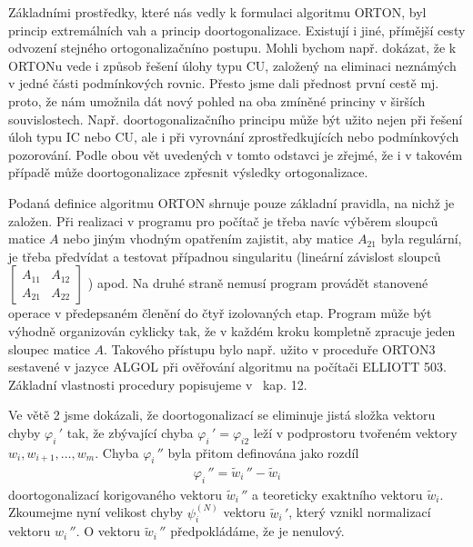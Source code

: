 Základními  prostředky, které nás vedly k formulaci
algoritmu ORTON, byl  princip extremálních vah a princip
doortogonalizace. Existují i jiné, přímější cesty odvození
stejného ortogonalizačníno postupu. Mohli bychom např. dokázat, že
k ORTONu vede i způsob řešení úlohy typu CU, založený na
eliminaci neznámých v jedné části podmínkových rovnic. Přesto jsme
dali přednost první cestě mj. proto, že nám umožnila dát nový
pohled na oba zmíněné princiny v širších souvislostech. Např.
doortogonalizačního principu může být užito nejen při řešení
úloh typu IC nebo CU, ale i při vyrovnání zprostředkujících
nebo podmínkových pozorování. Podle obou vět uvedených v tomto
odstavci je zřejmé, že i v takovém případě může doortogonalizace
zpřesnit výsledky  ortogonalizace.


Podaná definice algoritmu ORTON shrnuje pouze základní
pravidla, na nichž je založen. Při realizaci v programu pro
počítač je třeba navíc výběrem sloupců matice $A$ nebo jiným vhodným
opatřením zajistit, aby matice $A_{21}$ byla regulární, je třeba
předvídat a testovat případnou singularitu (lineární závislost
sloupců
%
$
\begin{bmatrix}
  A_{11} & A_{12} \\ A_{21} & A_{22}
\end{bmatrix}
$
%
) apod. Na druhé straně nemusí program provádět stanovené operace v
předepsaném členění do čtyř izolovaných etap. Program může být výhodně
organizován cyklicky tak, že v každém kroku kompletně zpracuje jeden
sloupec matice $A$.  Takového přístupu bylo např. užito v proceduře
ORTON3 sestavené v jazyce ALGOL při ověřování algoritmu na počítači
ELLIOTT 503.  Základní vlastnosti procedury popisujeme v~ kap. 12.

 Ve větě 2 jsme dokázali, že doortogonalizací se eliminuje
jistá složka vektoru chyby $\varphi_i\,'$ tak, že zbývající chyba
$\varphi_i\,' = \varphi_{i2}$ leží v podprostoru tvořeném vektory
$w_i,w_{i+1},\dots,w_m$. Chyba $\varphi_i\,''$ byla přitom definována
jako rozdíl
%
\begin{align*}
  \tag{6.22}
  \varphi_i\,'' = \widetilde w_i\,'' -  \widetilde w_i
\end{align*}
%
doortogonalizací korigovaného vektoru $\widetilde w_i\,''$ a
teoreticky exaktního vektoru $\widetilde w_i$. Zkoumejme nyní velikost
chyby $\psi_i^{(N)}$ vektoru $\widetilde w_i\,'$, který vznikl
normalizací vektoru $w_i\,''$. O vektoru $\widetilde w_i\,''$
předpokládáme, že je nenulový.

